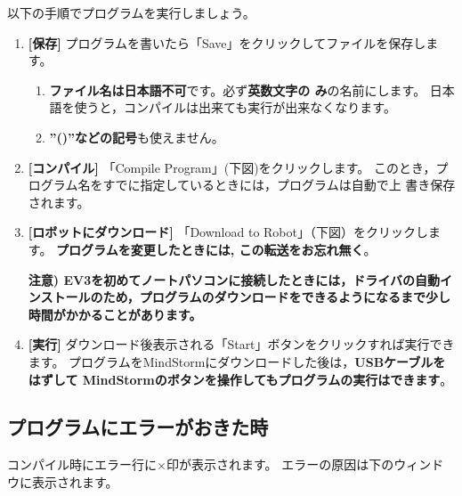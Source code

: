 \documentclass[11pt]{jsarticle}
\begin{document}
以下の手順でプログラムを実行しましょう。
\begin{enumerate}
\item \textbf{[保存]} \quad
  プログラムを書いたら「Save」をクリックしてファイルを保存します。
  \begin{enumerate}
  \item \textbf{ファイル名は日本語不可}です。必ず\textbf{英数文字の
    み}の名前にします。 日本語を使うと，コンパイルは出来ても実行が出来なくなります。
  \item \textbf{''()''などの記号}も使えません。
\end{enumerate}
\item \textbf{[コンパイル]}\quad
  「Compile Program」(下図)をクリックします。
  このとき，プログラム名をすでに指定しているときには，プログラムは自動で上
  書き保存されます。
\item \textbf{[ロボットにダウンロード]}\quad
  「Download to Robot」（下図）をクリックします。
  \textbf{プログラムを変更したときには, この転送をお忘れ無く}。
   \begin{center}
   \end{center}
   \textbf{注意) EV3を初めてノートパソコンに接続したときには，ドライバの自動インストールのため，プログラムのダウンロードをできるようになるまで少し時間がかかることがあります。}
\item \textbf{[実行]}\quad
  ダウンロード後表示される「Start」ボタンをクリックすれば実行できます。
  プログラムをMindStormにダウンロードした後は，\textbf{USBケーブルをはずして
    MindStormのボタンを操作してもプログラムの実行はできます}。
\end{enumerate}

\subsection{プログラムにエラーがおきた時}
コンパイル時にエラー行に$\times$印が表示されます。
エラーの原因は下のウィンドウに表示されます。
\end{document}
